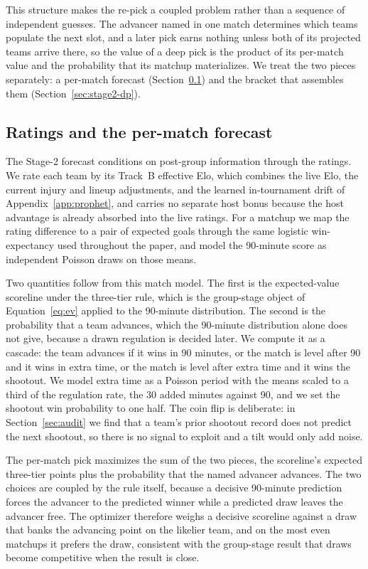 This structure makes the re-pick a coupled problem rather than a sequence of
independent guesses. The advancer named in one match determines which teams
populate the next slot, and a later pick earns nothing unless both of its
projected teams arrive there, so the value of a deep pick is the product of its
per-match value and the probability that its matchup materializes. We treat the
two pieces separately: a per-match forecast (Section~\ref{sec:stage2-match}) and
the bracket that assembles them (Section~\ref{sec:stage2-dp}).

\subsection{Ratings and the per-match forecast}\label{sec:stage2-match}

The Stage-2 forecast conditions on post-group information through the ratings.
We rate each team by its Track~B effective Elo, which combines the live Elo, the
current injury and lineup adjustments, and the learned in-tournament drift of
Appendix~\ref{app:prophet}, and carries no separate host bonus because the host
advantage is already absorbed into the live ratings. For a matchup we map the
rating difference to a pair of expected goals through the same logistic
win-expectancy used throughout the paper, and model the 90-minute score as
independent Poisson draws on those means.

Two quantities follow from this match model. The first is the expected-value
scoreline under the three-tier rule, which is the group-stage object of
Equation~\eqref{eq:ev} applied to the 90-minute distribution. The second is the
probability that a team advances, which the 90-minute distribution alone does not
give, because a drawn regulation is decided later. We compute it as a cascade:
the team advances if it wins in 90 minutes, or the match is level after 90 and it
wins in extra time, or the match is level after extra time and it wins the
shootout. We model extra time as a Poisson period with the means scaled to a
third of the regulation rate, the 30 added minutes against 90, and we set the
shootout win probability to one half. The coin flip is deliberate: in
Section~\ref{sec:audit} we find that a team's prior shootout record does not
predict the next shootout, so there is no signal to exploit and a tilt would only
add noise.

The per-match pick maximizes the sum of the two pieces, the scoreline's
expected three-tier points plus the probability that the named advancer
advances. The two choices are coupled by the rule itself, because a decisive
90-minute prediction forces the advancer to the predicted winner while a
predicted draw leaves the advancer free. The optimizer therefore weighs a
decisive scoreline against a draw that banks the advancing point on the
likelier team, and on the most even matchups it prefers the draw, consistent
with the group-stage result that draws become competitive when the result is
close.


